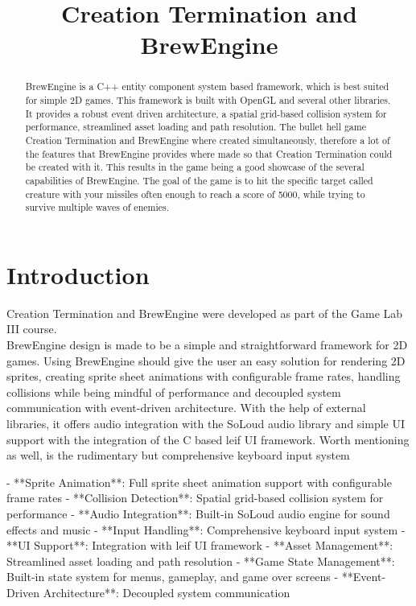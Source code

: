 \documentclass[conference]{IEEEtran}
\begin{document}
\title{Creation Termination and BrewEngine}

\author{}

\maketitle

\begin{abstract}
BrewEngine is a C++ entity component system based framework, which is best suited for simple 2D games. This framework is built with OpenGL and several other libraries. It provides a robust event driven architecture, a spatial grid-based collision system for performance, streamlined asset loading and path resolution. The bullet hell game Creation Termination and BrewEngine where created simultaneously, therefore a lot of the features that BrewEngine provides where made so that Creation Termination could be created with it. This results in the game being a good showcase of the several capabilities of BrewEngine. The goal of the game is to hit the specific target called creature with your missiles often enough to reach a score of 5000, while trying to survive multiple waves of enemies. 
\end{abstract}

\section{Introduction}
Creation Termination and BrewEngine were developed as part of the Game Lab III course.\\
BrewEngine design is made to be a simple and straightforward framework for 2D games. Using BrewEngine should give the user an easy solution for rendering 2D sprites, creating sprite sheet animations with configurable frame rates, handling collisions while being mindful of performance and decoupled system communication with event-driven architecture. With the help of external libraries, it offers audio integration with the SoLoud \cite{b1} audio library and simple UI support with the integration of the C based leif UI framework. Worth mentioning as well, is the rudimentary but comprehensive keyboard input system 

- **Sprite Animation**: Full sprite sheet animation support with configurable frame rates
- **Collision Detection**: Spatial grid-based collision system for performance
- **Audio Integration**: Built-in SoLoud audio engine for sound effects and music
- **Input Handling**: Comprehensive keyboard input system
- **UI Support**: Integration with leif UI framework
- **Asset Management**: Streamlined asset loading and path resolution
- **Game State Management**: Built-in state system for menus, gameplay, and game over screens
- **Event-Driven Architecture**: Decoupled system communication 
\end{document}
